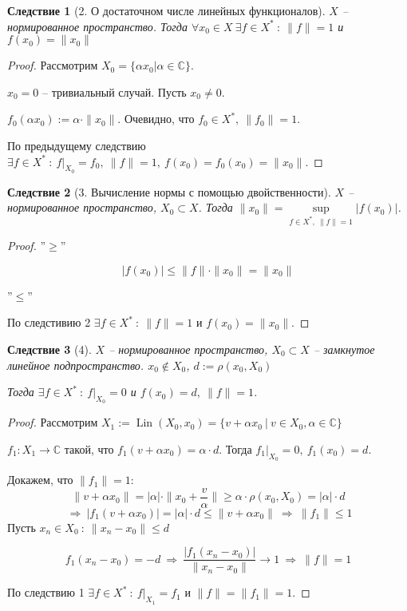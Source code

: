 \documentclass[12pt,a4paper]{report}
\DeclareMathOperator*{\Lin}{Lin}
\newcommand{\then}{\ \Longrightarrow \ }
\renewcommand{\C}{\mathbb{C}}
\newtheorem*{con}{Следствие}
\begin{document}
\begin{con}[2. О достаточном числе линейных функционалов]
$X$ -- нормированное пространство.
Тогда $\forall x_0 \in X \ \exists f \in X^* \ : \ \|f\|=1$ и $f(x_0) = \|x_0\|$
\end{con}

\begin{proof}
Рассмотрим $X_0 = \{ \alpha x_0 \big| \alpha \in \C \}$.

$x_0 = 0$ -- тривиальный случай. Пусть $x_0 \neq 0$.

$f_0(\alpha x_0) := \alpha \cdot \|x_0 \|$. Очевидно, что $f_0 \in X^*, \ \|f_0\| = 1.$

По предыдущему следствию $\exists f \in X^* \ : \ f\big|_{X_0} = f_0,\ \|f\| = 1, \ f(x_0) = f_0(x_0) = \|x_0\|$.
\end{proof}

\begin{con}[3. Вычисление нормы с помощью двойственности]
$X$ -- нормированное пространство, $X_0 \subset X$. Тогда $\|x_0\| = \sup\limits_{f \in X^*,\ \|f\|=1} |f(x_0)|$.
\end{con}

\begin{proof}
''$\ge$''

$$|f(x_0)| \le \| f \| \cdot \|x_0 \| = \|x_0\|$$

''$\le$''

По следстивию 2 $\exists f \in X^* \ : \ \|f\|=1$ и $f(x_0) = \|x_0\|$.
\end{proof}

\begin{con}[4]
$X$ -- нормированное пространство, $X_0 \subset X$ -- замкнутое линейное подпространство. 
$x_0 \not\in X_0$, $d := \rho(x_0,X_0)$

Тогда $\exists f \in X^* \ : \ f \big|_{X_0} = 0$ и $f(x_0) = d, \ \|f\| = 1$.
\end{con}

\begin{proof}
Рассмотрим $X_1 := \Lin(X_0, x_0) = \{ v + \alpha x_0 \ \big|\ v \in X_0, \alpha \in \C\}$

$f_1 : X_1 \to \C$ такой, что $f_1(v + \alpha x_0) = \alpha \cdot d$. Тогда $f_1\big|_{X_0} = 0, \ f_1(x_0) = d$.

Докажем, что $\|f_1\| = 1$:
$$\|v + \alpha x_0\| = |\alpha| \cdot \| x_0 + \frac{v}{\alpha}\| \ge \alpha \cdot \rho(x_0,X_0) = |\alpha| \cdot d$$
$$\then |f_1(v + \alpha x_0)| = |\alpha| \cdot d \le \|v + \alpha x_0 \| \then \|f_1\| \le 1$$
Пусть $x_n \in X_0 \ : \ \|x_n - x_0\| \le d$

$$f_1(x_n - x_0) = -d \then \frac{|f_1(x_n - x_0)|}{\|x_n - x_0\|} \to 1 \then \|f\| = 1$$

По следствию 1 $\exists f \in X^* \ : \ f\big|_{X_1} = f_1$ и $\|f\| = \|f_1\| = 1$.
\end{proof}
\end{document}
